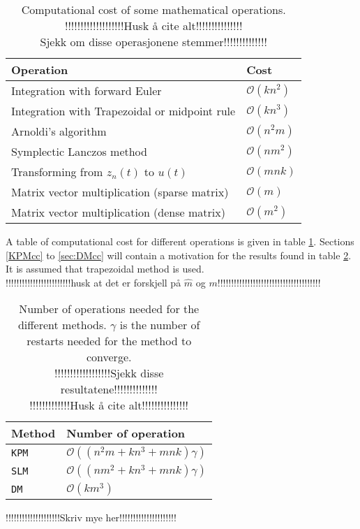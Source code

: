 \begin{table}
\begin{tabular}{l l }
Operation & Cost \\
\hline
Integration with forward Euler & $\mathcal{O}(k n^2)$ \\
Integration with Trapezoidal or midpoint rule & $\mathcal{O}(k n^3)$ \\
Arnoldi's algorithm & $ \mathcal{ O }(n^2 m)$ \\
Symplectic Lanczos method & $ \mathcal{O}(n m^2) $\\
Transforming from $z_n(t)$ to $u(t)$ & $ \mathcal{O}(mnk) $\\
Matrix vector multiplication (sparse matrix) & $ \mathcal{O}(m) $ \\
Matrix vector multiplication (dense matrix) & $ \mathcal{O}(m^2) $
\end{tabular}
\label{tab:cd}
\caption{Computational cost of some mathematical operations.
\\!!!!!!!!!!!!!!!!!!!Husk å cite alt!!!!!!!!!!!!!!! \\ Sjekk om disse operasjonene stemmer!!!!!!!!!!!!!!}
\end{table}

A table of computational cost for different operations is given in table \ref{tab:cd}. Sections \ref{KPMcc} to \ref{sec:DMcc} will contain a motivation for the results found in table \ref{tab:cc}. It is assumed that trapezoidal method is used. \\
!!!!!!!!!!!!!!!!!!!!!!!!husk at det er forskjell på $\hat{m}$ og $m$!!!!!!!!!!!!!!!!!!!!!!!!!!!!!!!!!!!!!!\\
\begin{table}
\begin{tabular}{l | l}
Method & Number of operation \\
\hline
\texttt{KPM} & $ \mathcal{O}((n^2 m + k n^3 + mnk)\gamma)$ \\ 
\texttt{SLM} & $ \mathcal{O}((n m^2 + k n^3 + mnk)\gamma) $  \\
\texttt{DM} & $\mathcal{O}(km^3)$ \\
\end{tabular}
\label{tab:cc}
\caption{Number of operations needed for the different methods. $\gamma$ is the number of restarts needed for the method to converge. 
\\!!!!!!!!!!!!!!!!!!Sjekk disse resultatene!!!!!!!!!!!!!!\\!!!!!!!!!!!!!Husk å cite alt!!!!!!!!!!!!!!!}
\end{table}
!!!!!!!!!!!!!!!!!!!!Skriv mye her!!!!!!!!!!!!!!!!!!!!!\\

